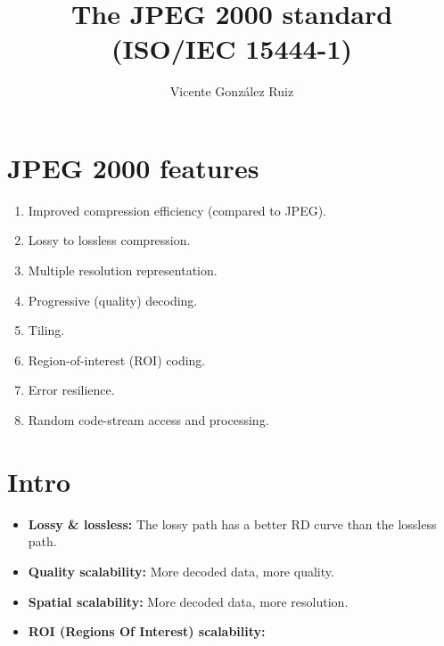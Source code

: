 \title{The JPEG 2000 standard (ISO/IEC 15444-1)}
\author{Vicente González Ruiz}
\maketitle
\tableofcontents

\section{JPEG 2000 features~\cite{rabbani2009jpeg}}
\begin{enumerate}
\item Improved compression efficiency (compared to JPEG).
\item Lossy to lossless compression.
\item Multiple resolution representation.
\item Progressive (quality) decoding.
\item Tiling.
\item Region-of-interest (ROI) coding.
\item Error resilience.
\item Random code-stream access and processing.
\end{enumerate}

\section{Intro~\cite{2002.taubman}}
\begin{itemize}
\item \textbf{Lossy \& lossless:} The lossy path has a better RD curve
  than the lossless path.
  \begin{center}
  \end{center}
\item \textbf{Quality scalability:} More decoded data, more quality.
  \begin{center}
  \end{center}
  
\item \textbf{Spatial scalability:} More decoded data, more
  resolution.
  \begin{center}
  \end{center}

\item \textbf{ROI (Regions Of Interest) scalability:}
  \begin{center}
  \end{center}

\end{itemize}

